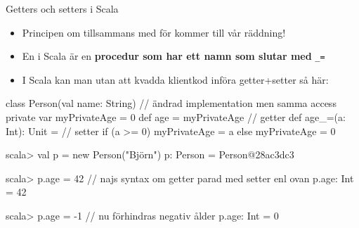 \begin{Slide}{Getters och setters i Scala}\SlideFontSmall
\setlength{\leftmargini}{0pt}
\begin{itemize}
\item Principen om  tillsammans med  för  kommer till vår räddning!

\item 
En  i Scala är en \textbf{procedur som har ett namn som slutar med} \texttt{\_=}
\pause
\item I Scala kan man utan att kvadda klientkod införa getter+setter så här:
\end{itemize}
\begin{Code}
class Person(val name: String) { // ändrad implementation men samma access
  private var myPrivateAge = 0
  def age = myPrivateAge         // getter
  def age_=(a: Int): Unit =      // setter
    if (a >= 0) myPrivateAge = a else myPrivateAge = 0
}
\end{Code}
\pause\vspace{-0.5em}
\begin{REPL}
scala> val p = new Person("Björn")
p: Person = Person@28ac3dc3

scala> p.age = 42      // najs syntax om getter parad med setter enl ovan
p.age: Int = 42
 
scala> p.age = -1      // nu förhindras negativ ålder
p.age: Int = 0
\end{REPL}
\end{Slide}






\fi


